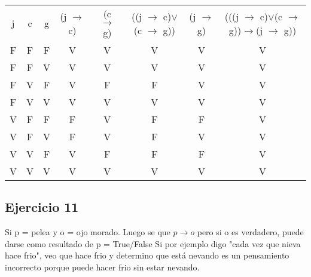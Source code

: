 \begin{tabular}{c|c|c|c|c|c|c|c}
    j & c & g & (j $\rightarrow$ c) & (c $\rightarrow$ g) & ((j $\rightarrow$ c)$\vee$(c $\rightarrow$ g)) & (j $\rightarrow$ g) & (((j $\rightarrow$ c)$\vee$(c $\rightarrow$ g))$\rightarrow$(j $\rightarrow$ g)) \\
    F          & F          & F          & V              & V              & V                          & V              & V                                      \\
    F          & F          & V          & V              & V              & V                          & V              & V                                      \\
    F          & V          & F          & V              & F              & F                          & V              & V                                      \\
    F          & V          & V          & V              & V              & V                          & V              & V                                      \\
    V          & F          & F          & F              & V              & F                          & F              & V                                      \\
    V          & F          & V          & F              & V              & F                          & V              & V                                      \\
    V          & V          & F          & V              & F              & F                          & F              & V                                      \\
    V          & V          & V          & V              & V              & V                          & V              & V                                     
\end{tabular}

\subsection{Ejercicio 11}
Si p = pelea y o = ojo morado. Luego se que $p \rightarrow o$ pero si o es verdadero, puede darse como resultado de p = True/False
Si por ejemplo digo "cada vez que nieva hace frio", veo que hace frio y determino que está nevando es un pensamiento incorrecto
porque puede hacer frio sin estar nevando.

